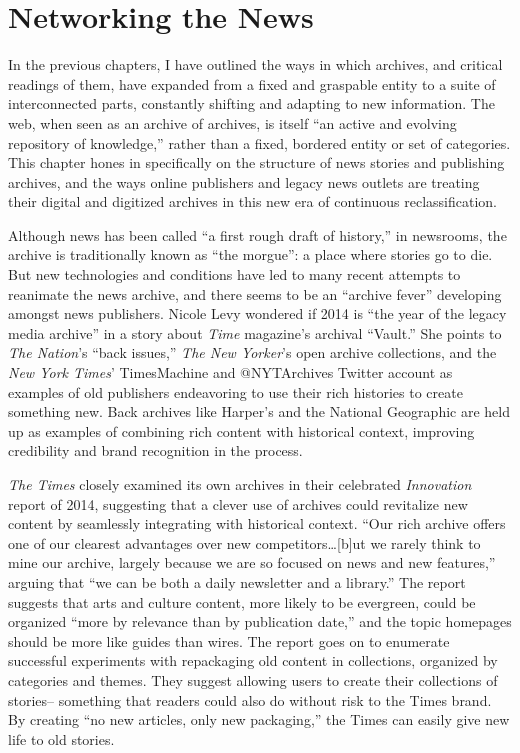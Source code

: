 \chapter{Networking the News}

In the previous chapters, I have outlined the ways in which archives, and critical readings of them, have expanded from a fixed and graspable entity to a suite of interconnected parts, constantly shifting and adapting to new information. The web, when seen as an archive of archives, is itself ``an active and evolving repository of knowledge,'' rather than a fixed, bordered entity or set of categories.\autocite[2]{chakrabarti_mining_2003} This chapter hones in specifically on the structure of news stories and publishing archives, and the ways online publishers and legacy news outlets are treating their digital and digitized archives in this new era of continuous reclassification.

Although news has been called ``a first rough draft of history,'' in newsrooms, the archive is traditionally known as ``the morgue'': a place where stories go to die. But new technologies and conditions have led to many recent attempts to reanimate the news archive, and there seems to be an ``archive fever'' developing amongst news publishers. Nicole Levy wondered if 2014 is ``the year of the legacy media archive'' in a story about \emph{Time} magazine's archival ``Vault.''\autocite{levy_time.com_2014} She points to \emph{The Nation}'s ``back issues,'' \emph{The New Yorker}'s open archive collections, and the \emph{New York Times}' TimesMachine and @NYTArchives Twitter account as examples of old publishers endeavoring to use their rich histories to create something new. Back archives like Harper's and the National Geographic are held up as examples of combining rich content with historical context, improving credibility and brand recognition in the process.

\emph{The Times} closely examined its own archives in their celebrated \emph{Innovation} report of 2014, suggesting that a clever use of archives could revitalize new content by seamlessly integrating with historical context. ``Our rich archive offers one of our clearest advantages over new competitors\ldots[b]ut we rarely think to mine our archive, largely because we are so focused on news and new features,'' arguing that ``we can be both a daily newsletter and a library.''\autocite[28]{_innovation_2014} The report suggests that arts and culture content, more likely to be evergreen, could be organized ``more by relevance than by publication date,'' and the topic homepages should be more like guides than wires.\autocite[29-30]{_innovation_2014} The report goes on to enumerate successful experiments with repackaging old content in collections, organized by categories and themes. They suggest allowing users to create their collections of stories-- something that readers could also do without risk to the Times brand. By creating ``no new articles, only new packaging,'' the Times can easily give new life to old stories.\autocite[34]{_innovation_2014}

